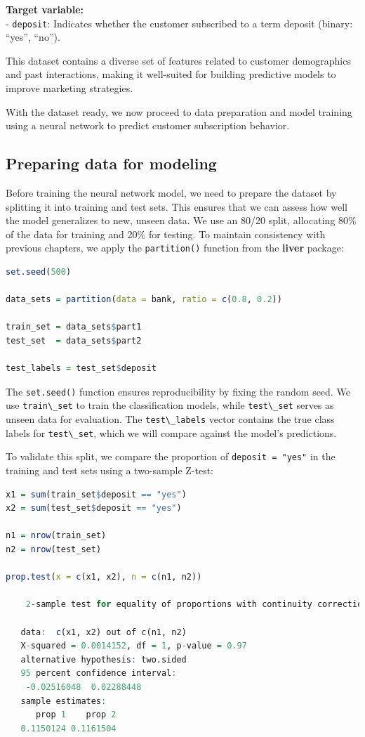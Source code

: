 \documentclass[
  11pt,
]{book}
\newcommand{\passthrough}[1]{#1}
\theoremstyle{definition}
\theoremstyle{definition}
\theoremstyle{definition}
\theoremstyle{definition}
\theoremstyle{remark}
\begin{document}
\textbf{Target variable:}\\
- \passthrough{\lstinline!deposit!}: Indicates whether the customer subscribed to a term deposit (binary: ``yes'', ``no'').

This dataset contains a diverse set of features related to customer demographics and past interactions, making it well-suited for building predictive models to improve marketing strategies.

With the dataset ready, we now proceed to data preparation and model training using a neural network to predict customer subscription behavior.

\subsection*{Preparing data for modeling}\label{preparing-data-for-modeling-3}


Before training the neural network model, we need to prepare the dataset by splitting it into training and test sets. This ensures that we can assess how well the model generalizes to new, unseen data. We use an 80/20 split, allocating 80\% of the data for training and 20\% for testing. To maintain consistency with previous chapters, we apply the \passthrough{\lstinline!partition()!} function from the \textbf{liver} package:

\begin{lstlisting}[language=R]
set.seed(500)

data_sets = partition(data = bank, ratio = c(0.8, 0.2))

train_set = data_sets$part1
test_set  = data_sets$part2

test_labels = test_set$deposit
\end{lstlisting}

The \passthrough{\lstinline!set.seed()!} function ensures reproducibility by fixing the random seed. We use \passthrough{\lstinline!train\_set!} to train the classification models, while \passthrough{\lstinline!test\_set!} serves as unseen data for evaluation. The \passthrough{\lstinline!test\_labels!} vector contains the true class labels for \passthrough{\lstinline!test\_set!}, which we will compare against the model's predictions.

To validate this split, we compare the proportion of \passthrough{\lstinline!deposit = "yes"!} in the training and test sets using a two-sample Z-test:

\begin{lstlisting}[language=R]
x1 = sum(train_set$deposit == "yes")
x2 = sum(test_set$deposit == "yes")

n1 = nrow(train_set)
n2 = nrow(test_set)

prop.test(x = c(x1, x2), n = c(n1, n2))
   
    2-sample test for equality of proportions with continuity correction
   
   data:  c(x1, x2) out of c(n1, n2)
   X-squared = 0.0014152, df = 1, p-value = 0.97
   alternative hypothesis: two.sided
   95 percent confidence interval:
    -0.02516048  0.02288448
   sample estimates:
      prop 1    prop 2 
   0.1150124 0.1161504
\end{lstlisting}
\end{document}
